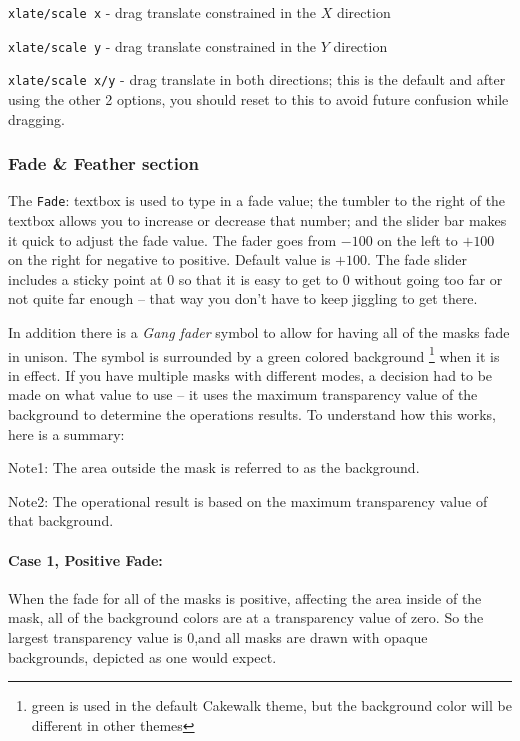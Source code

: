 \texttt{xlate/scale x}	- drag translate constrained in the $X$ direction

\texttt{xlate/scale y}	- drag translate constrained in the $Y$ direction

\texttt{xlate/scale x/y}	- drag translate in both directions; this is the default and after using the other 2 options, you should reset to this to avoid future confusion while dragging.

\subsubsection*{Fade \& Feather section}%
\label{ssub:fade_feather_section}

The \texttt{Fade}: textbox is used to type in a fade value; the tumbler to the right of the textbox allows you to increase or decrease that number; and the slider bar makes it quick to adjust the fade value.  The fader goes from $-100$ on the left to $+100$ on the right for negative to positive.  Default value is $+100$. The fade slider includes a sticky point at 0 so that it is easy to get to 0 without going too far or not quite far enough -- that way you don’t have to keep jiggling to get there. 

In addition there is a \textit{Gang fader} symbol to allow for having all of the masks fade in unison. The symbol is surrounded by a green colored background \protect\footnote{green is used in the default Cakewalk theme, but the background color will be different in other themes} when it is in effect.  If you have multiple masks with different modes, a decision had to be made on what value to use -- it uses the maximum transparency value of the background to determine the operations results.  To understand how this works, here is a summary:

Note1: The area outside the mask is referred to as the background.

Note2: The operational result is based on the maximum transparency value of that background.

\paragraph{Case 1, Positive Fade:} When the fade for all of the masks is positive, affecting the area inside of the mask, all of the
background colors are at a transparency value of zero. So the largest transparency value is 0,and all masks are drawn with opaque backgrounds, depicted as one would expect.

